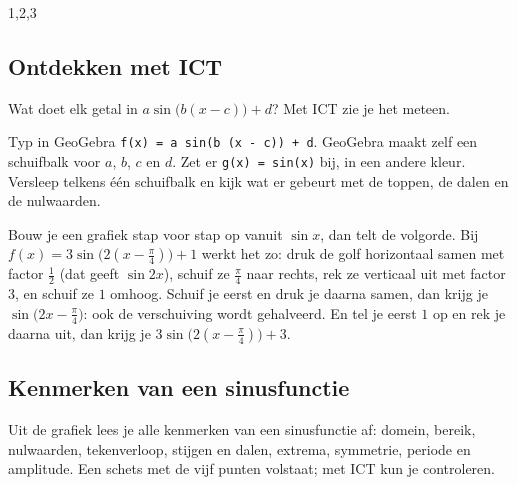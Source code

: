 \begin{oefeningen}

\end{oefeningen}
\begin{alleenvoor}{1,2,3}

\subsection{Ontdekken met ICT}

Wat doet elk getal in $a\sin\bigl(b(x - c)\bigr) + d$? Met ICT zie je het meteen.

\begin{werkwijze}
Typ in GeoGebra \texttt{f(x) = a sin(b (x - c)) + d}. GeoGebra maakt zelf een schuifbalk voor $a$, $b$, $c$ en $d$. Zet er \texttt{g(x) = sin(x)} bij, in een andere kleur. Versleep telkens één schuifbalk en kijk wat er gebeurt met de toppen, de dalen en de nulwaarden.
\end{werkwijze}

Bouw je een grafiek stap voor stap op vanuit $\sin x$, dan telt de volgorde. Bij $f(x) = 3\sin\bigl(2(x - \frac{\pi}{4})\bigr) + 1$ werkt het zo: druk de golf horizontaal samen met factor $\frac12$ (dat geeft $\sin 2x$), schuif ze $\frac{\pi}{4}$ naar rechts, rek ze verticaal uit met factor $3$, en schuif ze $1$ omhoog. Schuif je eerst en druk je daarna samen, dan krijg je $\sin\bigl(2x - \frac{\pi}{4}\bigr)$: ook de verschuiving wordt gehalveerd. En tel je eerst $1$ op en rek je daarna uit, dan krijg je $3\sin\bigl(2(x - \frac{\pi}{4})\bigr) + 3$.

\begin{oefeningen}
\end{oefeningen}

\subsection{Kenmerken van een sinusfunctie}

Uit de grafiek lees je alle kenmerken van een sinusfunctie af: domein, bereik, nulwaarden, tekenverloop, stijgen en dalen, extrema, symmetrie, periode en amplitude. Een schets met de vijf punten volstaat; met ICT kun je controleren.


\end{alleenvoor}
